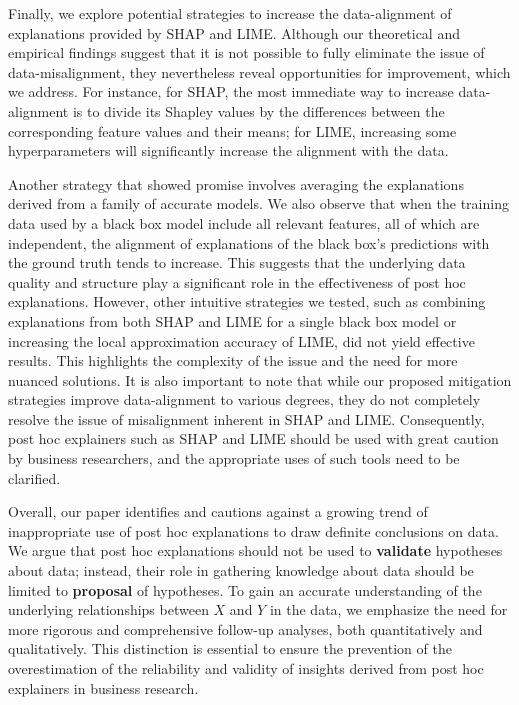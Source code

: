 \documentclass[12pt]{article}  %
\begin{document}
Finally, we explore potential strategies to increase the data-alignment of explanations provided by SHAP and LIME. Although our theoretical and empirical findings suggest that it is not possible to fully eliminate the issue of data-misalignment, they nevertheless reveal opportunities for improvement, which we address. For instance, for SHAP, the most immediate way to increase data-alignment is to divide its Shapley values by the differences between the corresponding feature values and their means; for LIME, increasing some hyperparameters will significantly increase the alignment with the data.

Another strategy that showed promise involves averaging the explanations derived from a family of accurate models. We also observe that when the training data used by a black box model include all relevant features, all of which are independent, the alignment of explanations of the black box's predictions with the ground truth tends to increase. This suggests that the underlying data quality and structure play a significant role in the effectiveness of post hoc explanations.
However, other intuitive strategies we tested, such as combining explanations from both SHAP and LIME for a single black box model or increasing the local approximation accuracy of LIME, did not yield effective results. This highlights the complexity of the issue and the need for more nuanced solutions.
It is also important to note that while our proposed mitigation strategies improve data-alignment to various degrees, they do not completely resolve the issue of misalignment inherent in SHAP and LIME. Consequently, post hoc explainers such as SHAP and LIME should be used with great caution by business researchers, and the appropriate uses of such tools need to be clarified.%


Overall, our paper identifies and cautions against a growing trend of inappropriate use of post hoc explanations to draw definite conclusions on data. We argue that post hoc explanations should not be used to \textbf{validate} hypotheses about data; instead, their role in gathering knowledge about data should be limited to \textbf{proposal} of hypotheses. To gain an accurate understanding of the underlying relationships between $X$ and $Y$ in the data, we emphasize the need for more rigorous and comprehensive follow-up analyses, both quantitatively and qualitatively. This distinction is essential to ensure the prevention of the overestimation of the reliability and validity of insights derived from post hoc explainers in business research.
\end{document}
